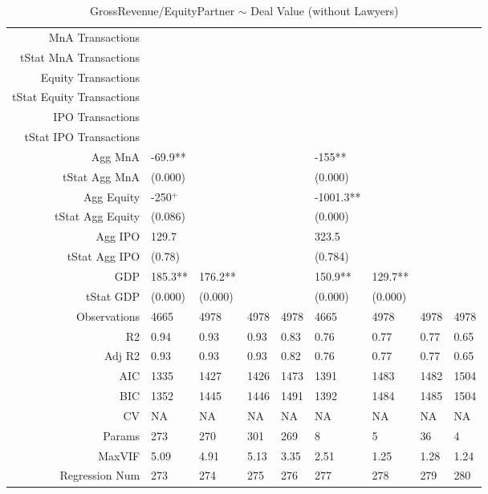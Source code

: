 \begin{table}[ht]
\begin{tabular}{rllllllll}
  MnA Transactions &  &  &  &  &  &  &  &  \\ 
  tStat MnA Transactions &  &  &  &  &  &  &  &  \\ 
  Equity Transactions &  &  &  &  &  &  &  &  \\ 
  tStat Equity Transactions &  &  &  &  &  &  &  &  \\ 
  IPO Transactions &  &  &  &  &  &  &  &  \\ 
  tStat IPO Transactions &  &  &  &  &  &  &  &  \\ 
  Agg MnA & -69.9** &  &  &  & -155** &  &  &  \\ 
  tStat Agg MnA & (0.000) &  &  &  & (0.000) &  &  &  \\ 
  Agg Equity & -250$^{+}$ &  &  &  & -1001.3** &  &  &  \\ 
  tStat Agg Equity & (0.086) &  &  &  & (0.000) &  &  &  \\ 
  Agg IPO & 129.7 &  &  &  & 323.5 &  &  &  \\ 
  tStat Agg IPO & (0.78) &  &  &  & (0.784) &  &  &  \\ 
  GDP & 185.3** & 176.2** &  &  & 150.9** & 129.7** &  &  \\ 
  tStat GDP & (0.000) & (0.000) &  &  & (0.000) & (0.000) &  &  \\ 
  Observations & 4665 & 4978 & 4978 & 4978 & 4665 & 4978 & 4978 & 4978 \\ 
  R2 & 0.94 & 0.93 & 0.93 & 0.83 & 0.76 & 0.77 & 0.77 & 0.65 \\ 
  Adj R2 & 0.93 & 0.93 & 0.93 & 0.82 & 0.76 & 0.77 & 0.77 & 0.65 \\ 
  AIC & 1335 & 1427 & 1426 & 1473 & 1391 & 1483 & 1482 & 1504 \\ 
  BIC & 1352 & 1445 & 1446 & 1491 & 1392 & 1484 & 1485 & 1504 \\ 
  CV & NA & NA & NA & NA & NA & NA & NA & NA \\ 
  Params & 273 & 270 & 301 & 269 & 8 & 5 & 36 & 4 \\ 
  MaxVIF & 5.09 & 4.91 & 5.13 & 3.35 & 2.51 & 1.25 & 1.28 & 1.24 \\ 
  Regression Num & 273 & 274 & 275 & 276 & 277 & 278 & 279 & 280 \\ 
   \hline
\end{tabular}
\caption{GrossRevenue/EquityPartner $\sim$ Deal Value (without Lawyers)} 
\end{table}
